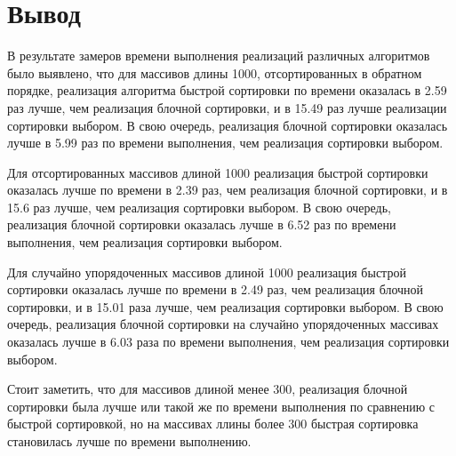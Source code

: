 \section*{Вывод}

В результате замеров времени выполнения реализаций различных алгоритмов было выявлено, что для массивов длины 1000, отсортированных в обратном порядке, реализация алгоритма быстрой сортировки по времени оказалась в 2.59 раз лучше, чем реализация блочной сортировки, и в 15.49 раз лучше реализации сортировки выбором. 
В свою очередь, реализация блочной сортировки оказалась лучше в 5.99 раз по времени выполнения, чем реализация  сортировки выбором.

Для отсортированных массивов длиной 1000 реализация быстрой сортировки оказалась лучше по времени в 2.39 раз, чем реализация блочной сортировки, и в 15.6 раз лучше, чем реализация сортировки выбором. 
В свою очередь, реализация блочной сортировки оказалась лучше в 6.52 раз по времени выполнения, чем реализация сортировки выбором.

Для случайно упорядоченных массивов длиной 1000 реализация быстрой сортировки оказалась лучше по времени в 2.49 раз, чем реализация блочной сортировки, и в 15.01 раза лучше, чем реализация сортировки выбором. 
В свою очередь, реализация блочной сортировки на случайно упорядоченных массивах оказалась лучше в 6.03 раза по времени выполнения, чем реализация сортировки выбором.

Стоит заметить, что для массивов длиной менее 300, реализация блочной сортировки была лучше или такой же по времени выполнения по сравнению с быстрой сортировкой, но на массивах ллины более 300 быстрая сортировка становилась лучше по времени выполнению.